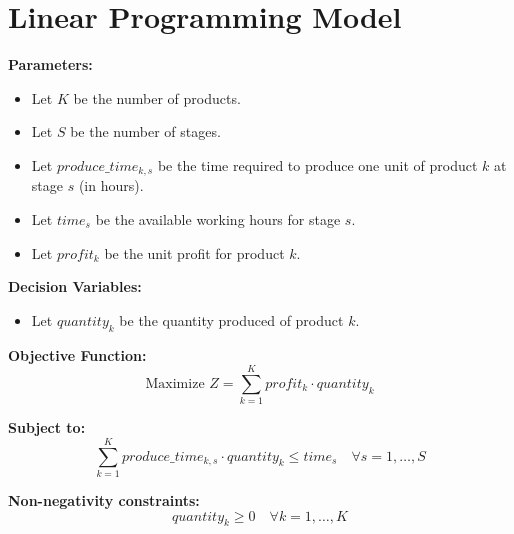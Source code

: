 \documentclass{article}
\begin{document}
\section*{Linear Programming Model}

\textbf{Parameters:}
\begin{itemize}
    \item Let $K$ be the number of products.
    \item Let $S$ be the number of stages.
    \item Let $produce\_time_{k,s}$ be the time required to produce one unit of product $k$ at stage $s$ (in hours).
    \item Let $time_s$ be the available working hours for stage $s$.
    \item Let $profit_k$ be the unit profit for product $k$.
\end{itemize}

\textbf{Decision Variables:}
\begin{itemize}
    \item Let $quantity_k$ be the quantity produced of product $k$.
\end{itemize}

\textbf{Objective Function:}
\[
\text{Maximize } Z = \sum_{k=1}^{K} profit_k \cdot quantity_k
\]

\textbf{Subject to:}
\[
\sum_{k=1}^{K} produce\_time_{k,s} \cdot quantity_k \leq time_s \quad \forall s = 1, \ldots, S
\]

\textbf{Non-negativity constraints:}
\[
quantity_k \geq 0 \quad \forall k = 1, \ldots, K
\]
\end{document}
